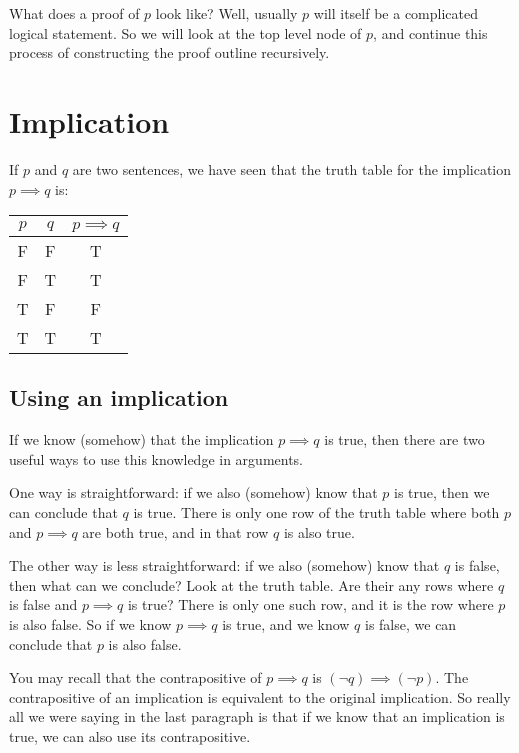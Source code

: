 \documentclass{article}
\begin{document}
What does a proof of $p$ look like?  Well, usually $p$ will itself be a complicated logical statement.  So we will look at the top level node of $p$, and continue this process of constructing the proof outline recursively.

\newpage

\section{Implication}

If $p$ and $q$ are two sentences, we have seen that the truth table for the implication $p \implies q$ is:

\begin{table}[h]
	\centering
	\begin{tabular}{c|c|c}
		$p$ & $q$ & $p \implies q$ 	\\ \hline
		F & F & T 	\\ \hline
		F & T & T 	\\ \hline
		T & F & F 	\\ \hline
		T &  T & T 	\\ \hline
	\end{tabular}
\end{table}

\subsection{Using an implication}

If we know (somehow) that the implication $p \implies q$ is true, then there are two useful ways to use this knowledge in arguments.

One way is straightforward:  if we also (somehow) know that $p$ is true, then we can conclude that $q$ is true.  There is only one row of the truth table where both $p$ and $p \implies q$ are both true, and in that row $q$ is also true.

The other way is less straightforward:  if we also (somehow) know that $q$ is false, then what can we conclude?  Look at the truth table.  Are their any rows where $q$ is false and $p \implies q$ is true?  There is only one such row, and it is the row where $p$ is also false.  So if we know $p \implies q$ is true, and we know $q$ is false,  we can conclude that $p$ is also false. 

You may recall that the contrapositive of $p \implies q$ is $(\neg q) \implies (\neg p)$.  The contrapositive of an implication is equivalent to the original implication.  So really all we were saying in the last paragraph is that if we know that an implication is true, we can also use its contrapositive.
\end{document}

